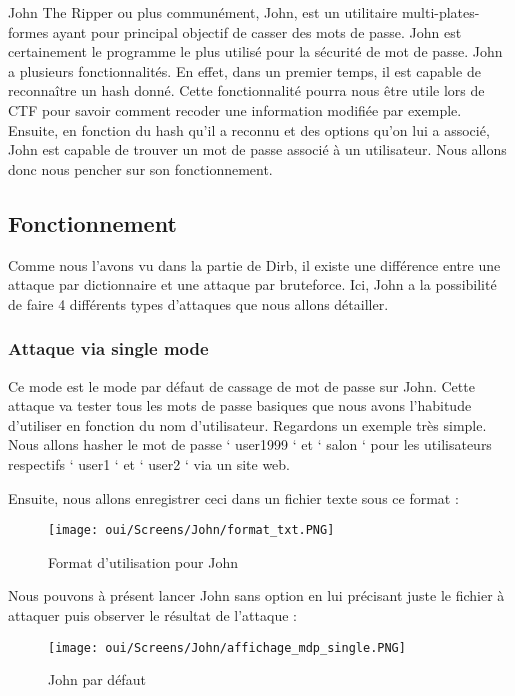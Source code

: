 John The Ripper ou plus communément, John, est un utilitaire multi-plates-formes ayant pour principal objectif de casser des mots de passe. John est certainement le programme le plus utilisé pour la sécurité de mot de passe.
John a plusieurs fonctionnalités. En effet, dans un premier temps, il est capable de reconnaître un hash donné. Cette fonctionnalité pourra nous être utile lors de CTF pour savoir comment recoder une information modifiée par exemple. Ensuite, en fonction du hash qu’il a reconnu et des options qu’on lui a associé, John est capable de trouver un mot de passe associé à un utilisateur.
Nous allons donc nous pencher sur son fonctionnement.

\subsection{Fonctionnement}

Comme nous l’avons vu dans la partie de Dirb, il existe une différence entre une attaque par dictionnaire et une attaque par bruteforce. Ici, John a la possibilité de faire 4 différents types d’attaques que nous allons détailler.

\subsubsection{Attaque via single mode}

Ce mode est le mode par défaut de cassage de mot de passe sur John. Cette attaque va tester tous les mots de passe basiques que nous avons l’habitude d’utiliser en fonction du nom d’utilisateur. Regardons un exemple très simple.
Nous allons hasher le mot de passe ‘ user1999 ‘ et ‘ salon ‘ pour les utilisateurs respectifs ‘ user1 ‘ et ‘ user2 ‘ via un site web.

Ensuite, nous allons enregistrer ceci dans un fichier texte sous ce format :

\begin{figure}[htp!]
  \centering
  \setlength\figureheight{7cm}
  \setlength\figurewidth{9cm}
  \texttt{[image: oui/Screens/John/format\_txt.PNG]}
  \caption{Format d'utilisation pour John}
  \label{fig:courbe-tikz}
\end{figure}

Nous pouvons à présent lancer John sans option en lui précisant juste le fichier à attaquer puis observer le résultat de l’attaque :

\begin{figure}[htp!]
  \centering
  \setlength\figureheight{7cm}
  \setlength\figurewidth{9cm}
  \texttt{[image: oui/Screens/John/affichage\_mdp\_single.PNG]}
  \caption{John par défaut}
  \label{fig:courbe-tikz}
\end{figure}

